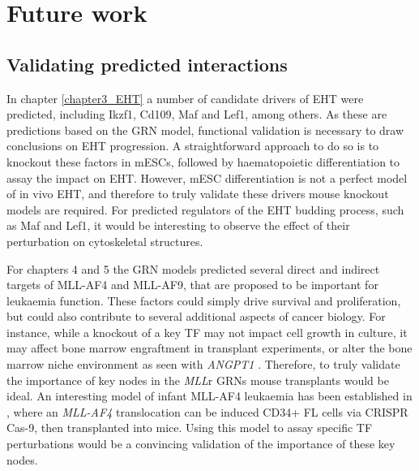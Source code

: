 
\section{Future work}


\subsection{Validating predicted interactions}

In chapter \ref{chapter3_EHT} a number of candidate drivers of EHT were predicted, including Ikzf1, Cd109, Maf and Lef1, among others. As these are predictions based on the GRN model, functional validation is necessary to draw conclusions on EHT progression. A straightforward approach to do so is to knockout these factors in mESCs, followed by haematopoietic differentiation to assay the impact on EHT. However, mESC differentiation is not a perfect model of in vivo EHT, and therefore to truly validate these drivers mouse knockout models are required. For predicted regulators of the EHT budding process, such as Maf and Lef1, it would be interesting to observe the effect of their perturbation on cytoskeletal structures. 


For chapters 4 and 5 the GRN models predicted several direct and indirect targets of MLL-AF4 and MLL-AF9, that are proposed to be important for leukaemia function. These factors could simply drive survival and proliferation, but could also contribute to several additional aspects of cancer biology. For instance, while a knockout of a key TF may not impact cell growth in culture, it may affect bone marrow engraftment in transplant experiments, or alter the bone marrow niche environment as seen with \textit{ANGPT1} \citep{zhou_hematopoietic_2015}. Therefore, to truly validate the importance of key nodes in the \textit{MLL}r GRNs mouse transplants would be ideal. An interesting model of infant MLL-AF4 leukaemia has been established in \cite{rice_human_2021}, where an \textit{MLL-AF4} translocation can be induced CD34+ FL cells via CRISPR Cas-9, then transplanted into mice. Using this model to assay specific TF perturbations would be a convincing validation of the importance of these key nodes. 

